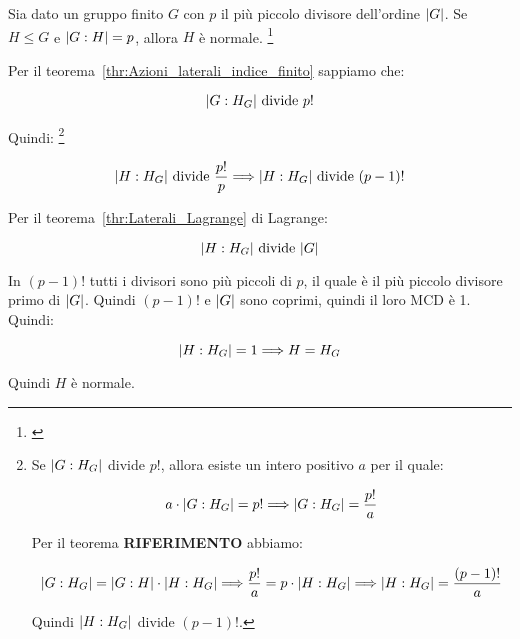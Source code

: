 \begin{esercizio}
	Sia dato un gruppo finito $G$ con $p$ il più piccolo divisore dell'ordine $\lvert G \rvert$. Se $H \le G$ e $\lvert G:H \rvert = p$, allora $H$ è normale.
	\footnote{\cite[Week 2, Exercise 8]{lucchini_week}}
\end{esercizio}
\begin{soluzione}
	Per il teorema~\ref{thr:Azioni_laterali_indice_finito} sappiamo che:
	
	\begin{equation}
		\lvert G:H_G \rvert \text{ divide } p!
	\end{equation}

	Quindi:
	\footnote{
		Se $\lvert G:H_G \rvert$ divide $p!$, allora esiste un intero positivo $a$ per il quale:
		
		\begin{equation}
			a \cdot \lvert G:H_G \rvert = p! \Longrightarrow \lvert G:H_G \rvert = \dfrac{p!}{a}
		\end{equation} 
	
		Per il teorema \textbf{RIFERIMENTO} abbiamo:
		
		\begin{equation}
			\lvert G:H_G \rvert = \lvert G:H \rvert \cdot \lvert H:H_G \rvert \Longrightarrow
			\dfrac{p!}{a} = p \cdot \lvert H:H_G \rvert \Longrightarrow
			\lvert H:H_G \rvert = \dfrac{(p-1)!}{a}
		\end{equation}
	
		Quindi $\lvert H:H_G \rvert$ divide $(p-1)!$.
	}
	
	\begin{equation}
		\lvert H:H_G \rvert \text{ divide } \dfrac{p!}{p} \Longrightarrow \lvert H:H_G \rvert \text{ divide } (p-1)!
	\end{equation}

	Per il teorema~\ref{thr:Laterali_Lagrange} di Lagrange:
	
	\begin{equation}
		\lvert H:H_G \rvert \text{ divide } \lvert G \rvert
	\end{equation}

	In $(p-1)!$ tutti i divisori sono più piccoli di $p$, il quale è il più piccolo divisore primo di $\lvert G \rvert$. Quindi $(p-1)!$ e $\lvert G \rvert$ sono coprimi, quindi il loro MCD è 1. Quindi:
	
	\begin{equation}
		\lvert H:H_G \rvert = 1 \Longrightarrow H = H_G
	\end{equation} 

	Quindi $H$ è normale.

\end{soluzione}

